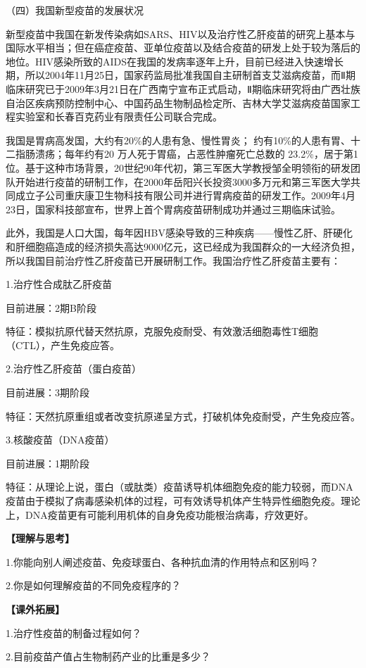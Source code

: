 （四）我国新型疫苗的发展状况

新型疫苗中我国在新发传染病如SARS、HIV以及治疗性乙肝疫苗的研究上基本与国际水平相当；但在癌症疫苗、亚单位疫苗以及结合疫苗的研发上处于较为落后的地位。HIV感染所致的AIDS在我国的发病率逐年上升，目前已经进入快速增长期，所以2004年11月25日，国家药监局批准我国自主研制首支艾滋病疫苗，而Ⅱ期临床研究已于2009年3月21日在广西南宁宣布正式启动，Ⅱ期临床研究将由广西壮族自治区疾病预防控制中心、中国药品生物制品检定所、吉林大学艾滋病疫苗国家工程实验室和长春百克药业有限责任公司联合完成。

我国是胃病高发国，大约有20\%的人患有急、慢性胃炎；
约有10\%的人患有胃、十二指肠溃疡；每年约有20
万人死于胃癌，占恶性肿瘤死亡总数的
23.2\%，居于第1位。基于这种市场背景，20世纪90年代初，第三军医大学教授邹全明领衔的研发团队开始进行疫苗的研制工作，在2000年岳阳兴长投资3000多万元和第三军医大学共同成立子公司重庆康卫生物科技有限公司并进行胃病疫苗的研发工作。2009年4月23日，国家科技部宣布，世界上首个胃病疫苗研制成功并通过三期临床试验。

此外，我国是人口大国，每年因HBV感染导致的三种疾病------慢性乙肝、肝硬化和肝细胞癌造成的经济损失高达9000亿元，这已经成为我国群众的一大经济负担，所以我国目前治疗性乙肝疫苗已开展研制工作。我国治疗性乙肝疫苗主要有：

1.治疗性合成肽乙肝疫苗

目前进展：2期B阶段

特征：模拟抗原代替天然抗原，克服免疫耐受、有效激活细胞毒性T细胞（CTL），产生免疫应答。

2.治疗性乙肝疫苗（蛋白疫苗）

目前进展：3期阶段

特征：天然抗原重组或者改变抗原递呈方式，打破机体免疫耐受，产生免疫应答。

3.核酸疫苗（DNA疫苗）

目前进展：1期阶段

特征：从理论上说，蛋白（或肽类）疫苗诱导机体细胞免疫的能力较弱，而DNA疫苗由于模拟了病毒感染机体的过程，可有效诱导机体产生特异性细胞免疫。理论上，DNA疫苗更有可能利用机体的自身免疫功能根治病毒，疗效更好。

\noindent\textbf{【理解与思考】}

1.你能向别人阐述疫苗、免疫球蛋白、各种抗血清的作用特点和区别吗？

2.你是如何理解疫苗的不同免疫程序的？

\noindent\textbf{【课外拓展】}

1.治疗性疫苗的制备过程如何？

2.目前疫苗产值占生物制药产业的比重是多少？


